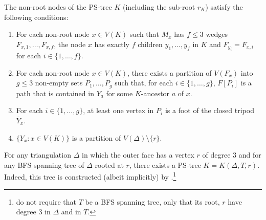 \documentclass{patmorin}
\renewcommand{\proplabel}[1]{\label{prop:#1}}
\begin{document}
The non-root nodes of the PS-tree $K$ (including the sub-root $r_K$) satisfy the following conditions:
\begin{enumerate}[(PR1)]
  \item \proplabel{children} For each non-root node $x\in V(K)$ such that $M_x$ has $f\le 3$ wedges $F_{x,1},\ldots,F_{x,f}$, the node $x$ has exactly $f$ children $y_1,\ldots,y_f$ in $K$ and $F_{y_i} = F_{x,i}$ for each $i\in\{1,\ldots,f\}$.
  
  \item \proplabel{ancestor-boundary} For each non-root node $x\in V(K)$, there exists a partition of $V(F_x)$ into $g\le 3$ non-empty sets $P_1,\ldots,P_g$ such that, for each $i\in\{1,\ldots,g\}$, $F[P_i]$ is a path that is contained in $Y_a$ for some $K$-ancestor $a$ of $x$. 
  
  \item \proplabel{tripod-feet} For each $i\in\{1,\ldots,g\}$, at least one vertex in $P_i$ is a foot of the closed tripod $\overline{Y}_x$.

  \item \proplabel{partition} $\{Y_x : x\in V(K)\}$ is a partition of $V(\Delta)\setminus\{r\}$.
\end{enumerate}

For any triangulation $\Delta$ in which the outer face has a vertex $r$ of degree 3 and for any BFS spanning tree of $\Delta$ rooted at $r$, there exists a PS-tree $K=K(\Delta,T,r)$.  Indeed, this tree is constructed (albeit implicitly) by \citet[Proof of Lemma~14]{dujmovic.joret.ea:planar}.\footnote{\citet{dujmovic.joret.ea:planar} do not require that $T$ be a BFS spanning tree, only that its root, $r$ have degree 3 in $\Delta$ and in $T$.}
\end{document}
